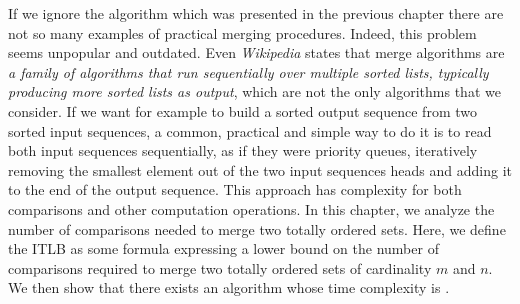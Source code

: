 \label{tree:merging:intro}

If we ignore the \mergesort algorithm which was presented in
the previous chapter there are not so many examples of practical merging
procedures. Indeed, this problem seems unpopular and outdated. Even
\emph{Wikipedia} states that merge algorithms are \emph{a family of algorithms
that run sequentially over multiple sorted lists, typically producing more
sorted lists as output}, which are not the only algorithms that we
consider. If we want for example to build a sorted output sequence from two
sorted input sequences, a common, practical and simple way to do it is to read
both input sequences sequentially, as if they were priority queues, iteratively
removing the smallest element out of the two input sequences heads and adding
it to the end of the output sequence. This approach has  complexity for
both comparisons and other computation operations. In this chapter, we
analyze the number of comparisons needed to merge two totally
ordered sets. Here, we define the ITLB as some formula expressing a lower
bound on the number of comparisons required to merge two totally ordered sets
of cardinality $m$ and $n$. We then show that there exists an algorithm
whose time complexity is .


